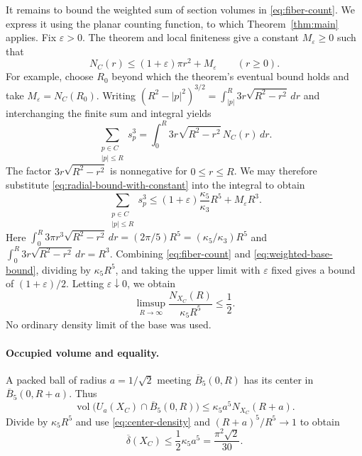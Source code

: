 \documentclass[11pt,a4paper]{article}
\theoremstyle{definition}
\theoremstyle{remark}
\DeclareMathOperator{\vol}{vol}
\begin{document}
It remains to bound the weighted sum of section volumes in
\eqref{eq:fiber-count}. We express it using the planar counting function,
to which Theorem~\ref{thm:main} applies. Fix $\varepsilon>0$.
The theorem and local finiteness give
a constant $M_\varepsilon\geq0$ such that
\begin{equation}
\label{eq:radial-bound-with-constant}
N_C(r)\leq(1+\varepsilon)\pi r^2+M_\varepsilon
\qquad(r\geq0).
\end{equation}
For example, choose $R_0$ beyond which the theorem's eventual bound
holds and take $M_\varepsilon=N_C(R_0)$.
Writing
$(R^2-|p|^2)^{3/2}=\int_{|p|}^R3r\sqrt{R^2-r^2}\,dr$
and interchanging the finite sum and integral yields
\begin{equation}
\label{eq:radial-integral}
\sum_{\substack{p\in C\\|p|\leq R}}s_p^3
=\int_0^R3r\sqrt{R^2-r^2}\,N_C(r)\,dr.
\end{equation}
The factor $3r\sqrt{R^2-r^2}$ is nonnegative for $0\leq r\leq R$.
We may therefore substitute \eqref{eq:radial-bound-with-constant}
into the integral to obtain
\begin{equation}
\label{eq:weighted-base-bound}
\sum_{\substack{p\in C\\|p|\leq R}}s_p^3
\leq(1+\varepsilon)\frac{\kappa_5}{\kappa_3}R^5
     +M_\varepsilon R^3.
\end{equation}
Here
$\int_0^R3\pi r^3\sqrt{R^2-r^2}\,dr
=(2\pi/5)R^5=(\kappa_5/\kappa_3)R^5$ and
$\int_0^R3r\sqrt{R^2-r^2}\,dr=R^3$.
Combining \eqref{eq:fiber-count} and \eqref{eq:weighted-base-bound},
dividing by $\kappa_5R^5$, and taking the upper limit with
$\varepsilon$ fixed gives a bound of $(1+\varepsilon)/2$.
Letting $\varepsilon\downarrow0$, we obtain
\begin{equation}
\label{eq:center-density}
\limsup_{R\to\infty}\frac{N_{X_C}(R)}{\kappa_5R^5}\leq\frac12.
\end{equation}
No ordinary density limit of the base was used.

\paragraph{Occupied volume and equality.}
A packed ball of radius $a=1/\sqrt2$ meeting $\overline B_5(0,R)$
has its center in $\overline B_5(0,R+a)$. Thus
\[
\vol\bigl(U_a(X_C)\cap\overline B_5(0,R)\bigr)
\leq\kappa_5a^5N_{X_C}(R+a).
\]
Divide by $\kappa_5R^5$ and use \eqref{eq:center-density} and
$(R+a)^5/R^5\to1$ to obtain
\[
\overline\delta(X_C)\leq\frac12\kappa_5a^5
=\frac{\pi^2\sqrt2}{30}.
\]
\end{document}
